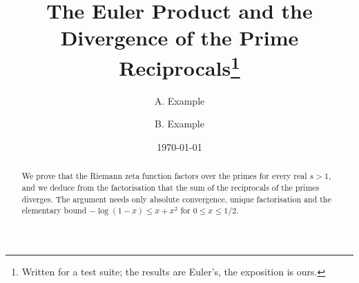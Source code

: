 \documentclass[11pt]{article}
\title{The Euler Product and the Divergence of the Prime
  Reciprocals\thanks{Written for a test suite; the results are
    Euler's, the exposition is ours.}}
\author{A. Example \and B. Example}
\date{\today}
\begin{document}
\maketitle

\begin{abstract}
We prove that the Riemann zeta function factors over the primes for every
real $s > 1$, and we deduce from the factorisation that the sum of the
reciprocals of the primes diverges. The argument needs only absolute
convergence, unique factorisation and the elementary bound
$-\log(1-x) \le x + x^2$ for $0 \le x \le 1/2$.
\end{abstract}





\appendix

\end{document}
